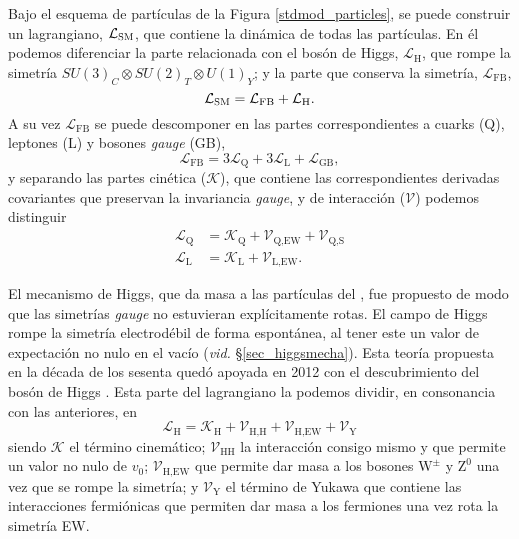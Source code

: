 Bajo el esquema de partículas de la Figura \ref{stdmod_particles}, se puede construir un lagrangiano, $\mathcal{L}_{\text{\textsc{SM}}}$, que contiene la dinámica de todas las partículas. En él podemos diferenciar la parte relacionada con el bosón de Higgs, $\mathcal{L}_{\text{H}}$, que rompe la simetría $ SU(3)_C \otimes SU(2)_T \otimes U(1)_Y $; y la parte que conserva la simetría, $\mathcal{L}_{\text{FB}}$,
\begin{equation}
\mathcal{L}_{\text{\textsc{SM}}} = \mathcal{L}_{\text{FB}} + \mathcal{L}_{\text{H}}.
\end{equation}
A su vez $\mathcal{L}_{\text{FB}}$ se puede descomponer en las partes correspondientes a cuarks (Q), leptones (L) y bosones \emph{gauge} (GB),
\begin{equation}
\mathcal{L}_{\text{FB}} = 3 \mathcal{L}_{\text{Q}} + 3 \mathcal{L}_{\text{L}} + \mathcal{L}_{\text{GB}},	
\end{equation}
y separando las partes cinética ($\mathcal{K}$), que contiene las correspondientes derivadas covariantes que preservan la invariancia \emph{gauge}, y de interacción ($\mathcal{V}$) podemos distinguir
\begin{equation}
\begin{split}
\mathcal{L}_{\text{Q}} &= \mathcal{K}_{\text{Q}} + \mathcal{V}_{\text{Q,EW}} + \mathcal{V}_{\text{Q,S}} \\
\mathcal{L}_{\text{L}} &= \mathcal{K}_{\text{L}} + \mathcal{V}_{\text{L,EW}} .
\end{split}	
\end{equation}

El mecanismo de Higgs, que da masa a las partículas del \stdmod, fue propuesto de modo que las simetrías \emph{gauge} no estuvieran explícitamente rotas. El campo de Higgs rompe la simetría electrodébil de forma espontánea, al tener este un valor de expectación no nulo en el vacío (\emph{vid.} \S \ref{sec_higgsmecha}). Esta teoría propuesta en la década de los sesenta quedó \color{vero} apoyada \color{norm} en 2012 con el descubrimiento del bosón de Higgs \cite{Aad:2012tfa,Chatrchyan:2012xdj}. Esta parte del lagrangiano la podemos dividir, en consonancia con las anteriores, en
\[\mathcal{L}_{\text{H}} = \mathcal{K}_{\text{H}} + \mathcal{V}_{\text{H,H}} + \mathcal{V}_{\text{H,EW}} + \mathcal{V}_{\text{Y}}\]
siendo $\mathcal{K}$ el término cinemático; $\mathcal{V}_{\text{HH}}$ la interacción consigo mismo y que permite un valor no nulo de $v_0$; $\mathcal{V}_{\text{H,EW}}$ 
que permite dar masa a los bosones $\mathrm{W^{\pm}}$ y $\mathrm{Z^0}$ una vez que se rompe la simetría; y  $\mathcal{V}_{\text{Y}}$ el término de Yukawa que contiene las interacciones fermiónicas que permiten dar masa a los fermiones una vez rota la simetría EW.


